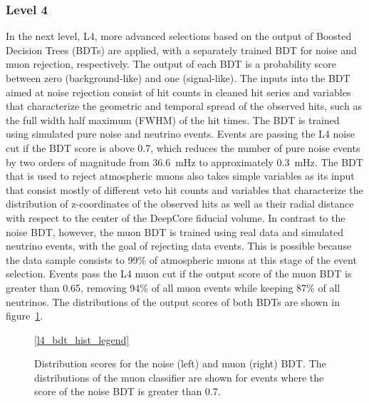 \subsubsection{Level 4}
\label{sec:level4-selection}
In the next level, L4, more advanced selections based on the output of Boosted Decision Trees (BDTs) are applied, with a separately trained BDT for noise and muon rejection, respectively. The output of each BDT is a probability score between zero (background-like) and one (signal-like).  The inputs into the BDT aimed at noise rejection consist of hit counts in cleaned hit series and variables that characterize the geometric and temporal spread of the observed hits, such as the full width half maximum (FWHM) of the hit times. The BDT is trained using simulated pure noise and neutrino events. Events are passing the L4 noise cut if the BDT score is above 0.7, which reduces the number of pure noise events by two orders of magnitude from 36.6~mHz to approximately 0.3~mHz. The BDT that is used to reject atmospheric muons also takes simple variables as its input that consist mostly of different veto hit counts and variables that characterize the distribution of z-coordinates of the observed hits as well as their radial distance with respect to the center of the DeepCore fiducial volume. In contrast to the noise BDT, however, the muon BDT is trained using real data and simulated neutrino events, with the goal of rejecting data events. This is possible because the data sample consists to 99\% of atmospheric muons at this stage of the event selection. Events pass the L4 muon cut if the output score of the muon BDT is greater than 0.65, removing 94\% of all muon events while keeping 87\% of all neutrinos. The distributions of the output scores of both BDTs are shown in figure~\ref{fig:l4-bdt-output}.
\begin{figure}
    \centering
    \ref{l4_bdt_hist_legend}\hfill
    
    
    
    \caption{Distribution scores for the noise (left) and muon (right) BDT. The distributions of the muon classifier are shown for events where the score of the noise BDT is greater than 0.7.}
    \label{fig:l4-bdt-output}
\end{figure}

